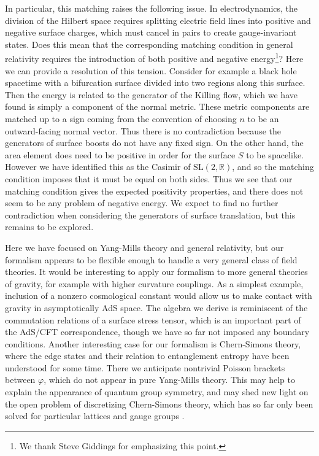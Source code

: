 \documentclass[a4paper,11pt]{article}
\newcommand{\slr}{\text{SL}(2,\mathbb{R})}
\begin{document}
In particular, this matching raises the following issue.
In electrodynamics, the division of the Hilbert space requires splitting electric field lines into positive and negative surface charges, which must cancel in pairs to create gauge-invariant states.
Does this mean that the corresponding matching condition in general relativity requires the introduction of both positive and negative energy\footnote{We thank Steve Giddings for emphasizing this point.}?
Here we can provide a resolution of this tension.
Consider for example a black hole spacetime with a bifurcation surface divided into two regions along this surface.
Then the energy is related to the generator of the Killing flow, which we have found is simply a component of the normal metric.
These metric components are matched up to a sign coming from the convention of choosing $n$ to be an outward-facing normal vector.
Thus there is no contradiction because the generators of surface boosts do not have any fixed sign.
On the other hand, the area element does need to be positive in order for the surface $S$ to be spacelike.
However we have identified this as the Casimir of $\slr$, and so the matching condition imposes that it must be equal on both sides.
Thus we see that our matching condition gives the expected positivity properties, and there does not seem to be any problem of negative energy.
We expect to find no further contradiction when considering the generators of surface translation, but this remains to be explored.

Here we have focused on Yang-Mills theory and general relativity, but our formalism appears to be flexible enough to handle a very general class of field theories.
It would be interesting to apply our formalism to more general theories of gravity, for example with higher curvature couplings.
As a simplest example, inclusion of a nonzero cosmological constant would allow us to make contact with gravity in asymptotically AdS space.
The algebra we derive is reminiscent of the commutation relations of a surface stress tensor, which is an important part of the AdS/CFT correspondence, though we have so far not imposed any boundary conditions.
Another interesting case for our formalism is Chern-Simons theory, where the edge states and their relation to entanglement entropy have been understood for some time.
There we anticipate nontrivial Poisson brackets between $\varphi$, which do not appear in pure Yang-Mills theory.
This may help to explain the appearance of quantum group symmetry, and may shed new light on the open problem of discretizing Chern-Simons theory, which has so far only been solved for particular lattices and gauge groups \cite{Turaev1992,Sun:2015hla}.
\end{document}

